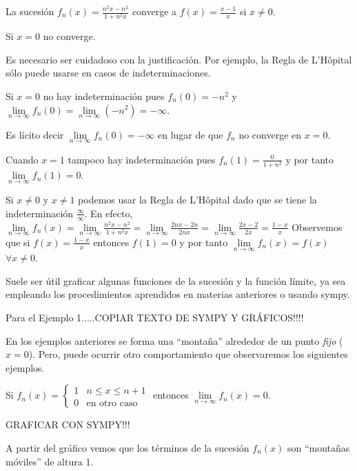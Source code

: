 \begin{ejemplo}
La sucesión $f_n(x)=\frac{n^2x-n^2}{1+n^2x}$ converge a $f(x)=\frac{x-1}{x}$ si $x \neq 0$.

Si $x=0$ no converge.

Es necesario ser cuidadoso con la justificación. Por ejemplo, la Regla de L'H\^opital  sólo puede usarse en casos de indeterminaciones.

Si $x=0$ no hay indeterminación pues $f_n(0)=-n^2 $ y 
$\lim\limits_{n \to \infty}f_n(0)=\lim\limits_{n \to \infty}(-n^2)=-\infty$. 

Es lícito decir $\lim\limits_{n \to \infty}f_n(0)=-\infty$ en lugar de que $f_n$ no converge en $x=0$.

Cuando $x=1$ tampoco hay indeterminación pues $f_n(1)=\frac{0}{1+n^2}$ y por tanto $\lim\limits_{n \to \infty} f_n(1)=0$. 
 
Si $x\neq 0$ y $x \neq 1$ podemos usar la Regla de L'H\^opital dado que se tiene la indeterminación $\frac{\infty}{\infty}$. 
En efecto, 
$\lim\limits_{n \to \infty}f_n(x)=
\lim\limits_{n \to \infty}\frac{n^2x-n^2}{1+n^2x}=
\lim\limits_{n \to \infty}\frac{2nx-2n}{2nx}=
\lim\limits_{n \to \infty}\frac{2x-2}{2x}=\frac{1-x}{x}
$
Observemos que si $f(x)=\frac{1-x}{x}$ entonces $f(1)=0$ y por tanto $\lim\limits_{n\to \infty}f_n(x)=f(x)$ $\forall x\neq 0$.

Suele ser útil graficar algunas funciones de la sucesión y la función límite, ya sea empleando los procedimientos aprendidos 
en materias anteriores o usando sympy.
\end{ejemplo}

Para el Ejemplo 1.....COPIAR TEXTO DE SYMPY Y GRÁFICOS!!!!

En los ejemplos anteriores se forma una ``montaña'' alrededor de un punto \emph{fijo} ($x=0$). 
Pero, puede ocurrir otro comportamiento que observaremos los siguientes ejemplos.

\begin{ejemplo}
Si  $f_n(x)=\left\{
\begin{array}{ll}
1&n\leq x\leq n+1
\\
0&\mbox{en otro caso}
\end{array}
\right.$
entonces $\lim\limits_{n \to \infty} f_n(x)=0$. 
\end{ejemplo} 

GRAFICAR CON SYMPY!!!

A partir del gráfico vemos que los términos de la sucesión $f_n(x)$ son ``montañas móviles'' de altura 1.


